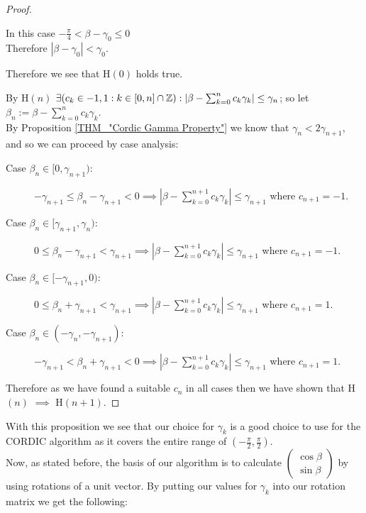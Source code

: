 {\begin{proof}
\begin{description}
\begin{description}
		In this case \(-\frac{\pi}{4} < \beta - \gamma_0 \le 0\)\\
		Therefore \(|\beta - \gamma_0| < \gamma_0\).
	\end{description}
	Therefore we see that \textrm{H\((0)\)} holds true.
\item[\textrm{H\((n)\) \(\implies\) H\((n+1)\)}:]\hfill\break
	By \textrm{H\((n)\)} \(\exists (c_k \in {-1,1} : k \in [0,n] \cap \mathbb{Z}) : |\beta - \sum_{k=0}^nc_k\gamma_k| \le \gamma_n\); so let \(\beta_n := \beta - \sum_{k=0}^nc_k\gamma_k\).\\
	By Proposition \ref{THM_"Cordic Gamma Property"} we know that \(\gamma_n < 2\gamma_{n+1}\), and so we can proceed by case analysis:
	\begin{description}
	\item[Case \(\beta_n \in [0, \gamma_{n+1})\):]\hfill\break
		\(-\gamma_{n+1} \le \beta_n - \gamma_{n+1} < 0 \implies |\beta - \sum_{k=0}^{n+1}c_k\gamma_k| \le \gamma_{n+1}\) where \(c_{n+1} = -1\).
	\item[Case \(\beta_n \in [\gamma_{n+1}, \gamma_n)\):]\hfill\break
		\(0 \le \beta_n - \gamma_{n+1} < \gamma_{n+1} \implies |\beta - \sum_{k=0}^{n+1}c_k\gamma_k| \le \gamma_{n+1}\) where \(c_{n+1} = -1\).
	\item[Case \(\beta_n \in [-\gamma_{n+1}, 0)\):]\hfill\break
		\(0 \le \beta_n + \gamma_{n+1} < \gamma_{n+1} \implies |\beta - \sum_{k=0}^{n+1}c_k\gamma_k| \le \gamma_{n+1}\) where \(c_{n+1} = 1\).
	\item[Case \(\beta_n \in (-\gamma_n, -\gamma_{n+1})\):]\hfill\break
		\(-\gamma_{n+1} < \beta_n + \gamma_{n+1} < 0 \implies |\beta - \sum_{k=0}^{n+1}c_k\gamma_k| \le \gamma_{n+1}\) where \(c_{n+1} = 1\).
	\end{description}
\end{description}
	Therefore as we have found a suitable \(c_n\) in all cases then we have shown that \textrm{H\((n)\) \(\implies\) H\((n+1)\)}.
\end{proof}

With this proposition we see that our choice for \(\gamma_k\) is a good choice to use for the CORDIC algorithm as it covers the entire range of \((-\frac{\pi}{2}, \frac{\pi}{2})\).\\

Now, as stated before, the basis of our algorithm is to calculate \(\left(\begin{array}{c}\cos\beta\\\sin\beta\end{array}\right)\) by using rotations of a unit vector. By putting our values for \(\gamma_k\) into our rotation matrix we get the following:

}
